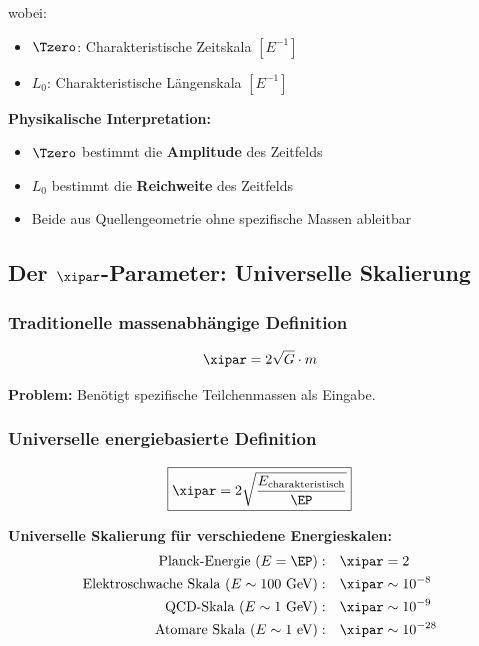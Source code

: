 	wobei:
	\begin{itemize}
		\item $\Tzero$: Charakteristische Zeitskala $[E^{-1}]$
		\item $L_0$: Charakteristische Längenskala $[E^{-1}]$
	\end{itemize}
	
	\textbf{Physikalische Interpretation:}
	\begin{itemize}
		\item $\Tzero$ bestimmt die \textbf{Amplitude} des Zeitfelds
		\item $L_0$ bestimmt die \textbf{Reichweite} des Zeitfelds
		\item Beide aus Quellengeometrie ohne spezifische Massen ableitbar
	\end{itemize}
	
	\subsection{Der $\xipar$-Parameter: Universelle Skalierung}
	\label{subsec:xi_elimination}
	
	\subsubsection{Traditionelle massenabhängige Definition}
	
	\begin{equation}
		\xipar = 2\sqrt{G} \cdot m
		\label{eq:xi_original}
	\end{equation}
	
	\textbf{Problem:} Benötigt spezifische Teilchenmassen als Eingabe.
	
	\subsubsection{Universelle energiebasierte Definition}
	
	\begin{equation}
		\boxed{\xipar = 2\sqrt{\frac{E_{\text{charakteristisch}}}{\EP}}}
		\label{eq:xi_mass_free}
	\end{equation}
	
	\textbf{Universelle Skalierung für verschiedene Energieskalen:}
	\begin{align}
		\text{Planck-Energie } (E = \EP): \quad &\xipar = 2 \\
		\text{Elektroschwache Skala } (E \sim 100 \text{ GeV}): \quad &\xipar \sim 10^{-8} \\
		\text{QCD-Skala } (E \sim 1 \text{ GeV}): \quad &\xipar \sim 10^{-9} \\
		\text{Atomare Skala } (E \sim 1 \text{ eV}): \quad &\xipar \sim 10^{-28}
	\end{align}
	
